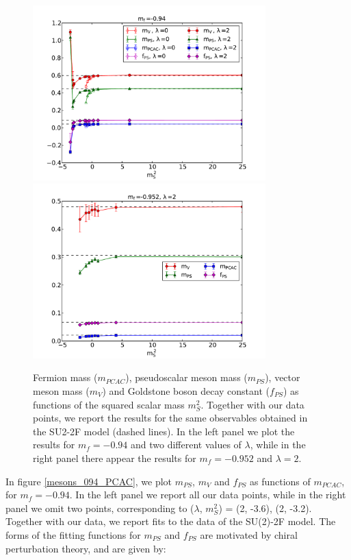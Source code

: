 \begin{figure}[thb] 
\begin{adjustwidth}{-4em}{-4em}
  \includegraphics[width=9cm,clip]{pics/mesons_094} ~\includegraphics[width=9cm,clip]{pics/mesons_0952} 
  \end{adjustwidth}
  \caption{Fermion mass ($m_{PCAC}$), pseudoscalar meson mass ($m_{PS}$), vector meson mass ($m_V$) and Goldstone boson decay constant ($f_{PS}$) as functions of the squared scalar mass $m_S^2$. Together with our data points, we report the results for the same observables obtained in the SU2-2F model (dashed lines). In the left panel we plot the results for $m_f = -0.94$ and two different values of $\lambda$, while in the right panel there appear the results for $m_f = -0.952$ and $\lambda = 2$.}
  \label{mesons_mS}
\end{figure}

In figure \ref{mesons_094_PCAC}, we plot $m_{PS}$, $m_V$ and $f_{PS}$ as functions of $m_{PCAC}$, for $m_f = -0.94$. In the left panel we report all our data points, while in the right panel we omit two points, corresponding to ($\lambda$, $m_S^2$) = (2, -3.6), (2, -3.2). Together with our data, we report fits to the data of the SU(2)-2F model. The forms of the fitting functions for $m_{PS}$ and $f_{PS}$ are motivated by chiral perturbation theory, and are given by:

